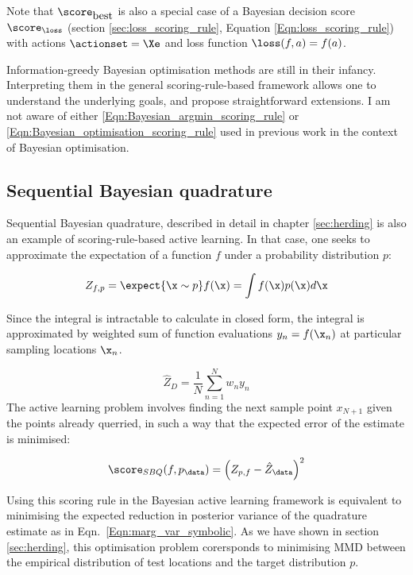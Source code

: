Note that $\score_{\mbox{best}}$ is also a special case of a Bayesian decision score $\score_{\loss}$ (section \ref{sec:loss_scoring_rule}, Equation \eqref{Eqn:loss_scoring_rule}) with actions $\actionset=\Xe$ and loss function $\loss(f,a)=f(a)$.

Information-greedy Bayesian optimisation methods are still in their infancy. Interpreting them in the general scoring-rule-based framework allows one to understand the underlying goals, and propose straightforward extensions. I am not aware of either \eqref{Eqn:Bayesian_argmin_scoring_rule} or \eqref{Eqn:Bayesian_optimisation_scoring_rule} used in previous work in the context of Bayesian optimisation.

\subsection{Sequential Bayesian quadrature}

Sequential Bayesian quadrature, described in detail in chapter \ref{sec:herding} is also an example of scoring-rule-based active learning. In that case, one seeks to approximate the expectation of a function $f$ under a probability distribution $p$:

\begin{equation}
	Z_{f,p} = \expect{\x\sim p}f(\x) = \int f(\x) p(\x) d\x
\end{equation}

Since the integral is intractable to calculate in closed form, the integral is approximated by weighted sum of function evaluations $y_n = f(\x_n)$ at particular sampling locations $\x_n$.

\begin{equation}
	\hat{Z}_{D} = \frac{1}{N}\sum_{n=1}^{N} w_n y_n
\end{equation}
 The active learning problem involves finding the next sample point $x_{N+1}$ given the points already querried, in such a way that the expected error of the estimate is minimised:

\begin{equation}
	\score_{SBQ}(f,p_\data) = \left(Z_{p,f} - \hat{Z}_\data \right)^2
\end{equation}

Using this scoring rule in the Bayesian active learning framework is equivalent to minimising the expected reduction in posterior variance of the quadrature estimate as in Eqn.\ \eqref{Eqn:marg_var_symbolic}. As we have shown in section \ref{sec:herding}, this optimisation problem corersponds to minimising MMD between the empirical distribution of test locations and the target distribution $p$.

